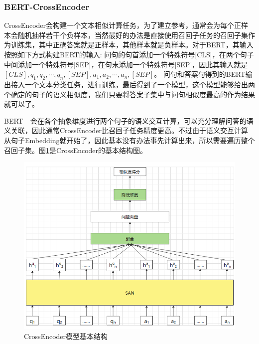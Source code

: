 \documentclass[twoside,a4paper,12pt]{book}%
\begin{document}
\subsubsection{BERT-CrossEncoder}
CrossEncoder会构建一个文本相似计算任务，为了建立参考，通常会为每个正样本会随机抽样若干个负样本，当然最好的办法是直接使用召回子任务的召回子集作为训练集，其中正确答案就是正样本，其他样本就是负样本。对于\gls{BERT}，其输入按照如下方式构建\gls{BERT}的输入: 问句的句首添加一个特殊符号[CLS]，在两个句子中间添加一个特殊符号[SEP]，在句末添加一个特殊符号[SEP]，因此其输入就是$[CLS],q_1,q_2,\cdots,q_n,[SEP],a_1,a_2,\cdots,a_n,[SEP]$。
问句和答案句得到的\gls{BERT}输出接入一个文本分类任务，进行训练，最后得到了一个模型，这个模型能够给出两个确定的句子的语义相似度，我们只要将答案子集中与问句相似度最高的作为结果就可以了。

\gls{BERT}　会在各个抽象维度进行两个句子的语义交互计算，可以充分理解问答的语义关联，因此通常CrossEncoder比召回子任务精度更高。不过由于语义交互计算从句子Embedding就开始了，因此基本没有办法事先计算出来，所以需要遍历整个召回子集。图\ref{fig:bert_cross_encoder}是CrossEncoder的基本结构图。
\begin{figure}[h]
\begin{center}
\includegraphics[width=5.6in]{figures/crossencoder1.png}
\caption{CrossEncoder模型基本结构}
\label{fig:bert_cross_encoder}
\end{center}
\end{figure}
\end{document}
